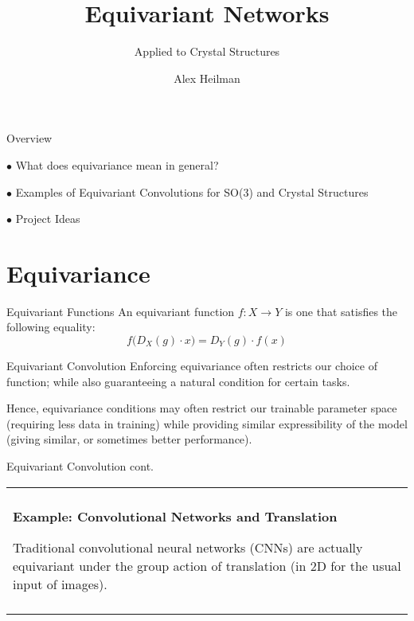 \documentclass[handout, 11pt]{beamer}
\author{Alex Heilman}
\title{Equivariant Networks}
\subtitle{Applied to Crystal Structures}
\newenvironment{boxed2}
    {\begin{center}
    \begin{tabular}{|p{0.95\textwidth}|}
    \hline\\
    }
    { 
    \\\\\hline
    \end{tabular} 
    \end{center}
    }
\begin{document}
\begin{frame}
\titlepage
\end{frame}


\begin{frame}{Overview}

$\bullet$ What does equivariance mean in general? \pause

\vspace{1cm}

$\bullet$ Examples of Equivariant Convolutions for SO(3) and Crystal Structures \pause

\vspace{1cm}

$\bullet$ Project Ideas

\end{frame}

\section{Equivariance}

\begin{frame}{Equivariant Functions}
An equivariant function $f:X\rightarrow Y$ is one that satisfies the following equality:
$$
f \big(D_X(g)\cdot x\big) = D_Y(g)\cdot f(x)
$$

\end{frame}

\begin{frame}{Equivariant Convolution}
Enforcing equivariance often restricts our choice of function; while also guaranteeing a natural condition for certain tasks.

\medskip

Hence, equivariance conditions may often restrict our trainable parameter space (requiring less data in training) while 
providing similar expressibility of the model (giving similar, or sometimes better performance).

\medskip


\end{frame}

\begin{frame}{Equivariant Convolution cont.}
\begin{boxed2}
\textbf{Example: Convolutional Networks and Translation}

Traditional convolutional neural networks (CNNs) are actually equivariant under the group action of translation (in 2D for 
the usual input of images).
\end{boxed2}
\end{frame}
\end{document}
